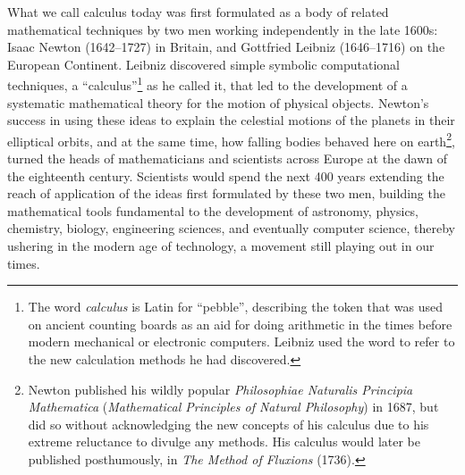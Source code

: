 \documentclass[11pt]{article}
\begin{document}
What we call calculus today was first formulated as a body of related mathematical techniques by two men working independently in the late 1600s: Isaac Newton (1642--1727) in Britain, and Gottfried Leibniz (1646--1716) on the European Continent. Leibniz discovered simple symbolic computational techniques, a ``calculus''\footnote{The word \emph{calculus} is Latin for ``pebble'', describing the token that was used on ancient counting boards as an aid for doing arithmetic in the times before modern mechanical or electronic computers. Leibniz used the word to refer to the new calculation methods he had discovered.}  as he called it, that led to the development of a systematic mathematical theory for the motion of physical objects. Newton's success in using these ideas to explain the celestial motions of the planets in their elliptical orbits, and at the same time, how falling bodies behaved here on earth\footnote{Newton published his wildly popular \emph{Philosophiae Naturalis Principia Mathematica} (\emph{Mathematical Principles of Natural Philosophy}) in 1687, but did so without acknowledging the new concepts of his calculus due to his extreme reluctance to divulge any methods. His calculus would later be published posthumously, in \emph{The Method of Fluxions} (1736).}, turned the heads of mathematicians and scientists across Europe at the dawn of the eighteenth century. Scientists would spend the next 400 years extending the reach of application of the ideas first formulated by these two men, building the mathematical tools fundamental to the development of astronomy, physics, chemistry, biology, engineering sciences, and eventually computer science, thereby ushering in the modern age of technology, a movement still playing out in our times.
\end{document}
